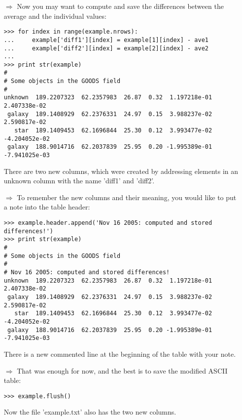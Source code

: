 \begin{itemize}
\item[$\Rightarrow$] Now you may want to compute and save the differences
between the average and the individual values:
\begin{small}
\begin{verbatim}
>>> for index in range(example.nrows):
...     example['diff1'][index] = example[1][index] - ave1
...     example['diff2'][index] = example[2][index] - ave2
... 
>>> print str(example)
#
# Some objects in the GOODS field
#
unknown  189.2207323  62.2357983  26.87  0.32  1.197218e-01  2.407338e-02
 galaxy  189.1408929  62.2376331  24.97  0.15  3.988237e-02  2.590817e-02
   star  189.1409453  62.1696844  25.30  0.12  3.993477e-02 -4.204052e-02
 galaxy  188.9014716  62.2037839  25.95  0.20 -1.995389e-01 -7.941025e-03
\end{verbatim}
\end{small}
There are two new columns, which were created by addressing elements in
an unknown column with the name 'diff1' and 'diff2'.

\item[$\Rightarrow$] To remember the new columns and their meaning,
you would like to put a note into the table header:
\begin{small}
\begin{verbatim}
>>> example.header.append('Nov 16 2005: computed and stored differences!')
>>> print str(example)
#
# Some objects in the GOODS field
#
# Nov 16 2005: computed and stored differences!
unknown  189.2207323  62.2357983  26.87  0.32  1.197218e-01  2.407338e-02
 galaxy  189.1408929  62.2376331  24.97  0.15  3.988237e-02  2.590817e-02
   star  189.1409453  62.1696844  25.30  0.12  3.993477e-02 -4.204052e-02
 galaxy  188.9014716  62.2037839  25.95  0.20 -1.995389e-01 -7.941025e-03
\end{verbatim}
\end{small}
There is a new commented line at the beginning of the table
with your note.

\item[$\Rightarrow$] That was enough for now, and the best is to save
the modified ASCII table:
 \begin{verbatim}
>>> example.flush()
\end{verbatim}
Now the file 'example.txt' also has the two new columns.


\end{itemize}
